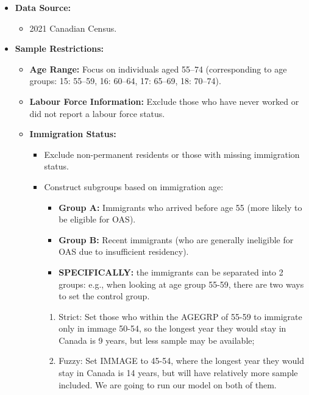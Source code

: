 \documentclass[
]{article}
\providecommand{\tightlist}{%
  \setlength{\itemsep}{0pt}\setlength{\parskip}{0pt}}
\begin{document}
\begin{itemize}
\tightlist
\item
  \textbf{Data Source:}

  \begin{itemize}
  \tightlist
  \item
    2021 Canadian Census.
  \end{itemize}
\item
  \textbf{Sample Restrictions:}

  \begin{itemize}
  \tightlist
  \item
    \textbf{Age Range:} Focus on individuals aged 55--74 (corresponding
    to age groups: 15: 55--59, 16: 60--64, 17: 65--69, 18: 70--74).
  \item
    \textbf{Labour Force Information:} Exclude those who have never
    worked or did not report a labour force status.
  \item
    \textbf{Immigration Status:}

    \begin{itemize}
    \tightlist
    \item
      Exclude non-permanent residents or those with missing immigration
      status.
    \item
      Construct subgroups based on immigration age:

      \begin{itemize}
      \tightlist
      \item
        \textbf{Group A:} Immigrants who arrived before age 55 (more
        likely to be eligible for OAS).
      \item
        \textbf{Group B:} Recent immigrants (who are generally
        ineligible for OAS due to insufficient residency).
      \item
        \textbf{SPECIFICALLY:} the immigrants can be separated into 2
        groups: e.g., when looking at age group 55-59, there are two
        ways to set the control group.
      \end{itemize}

      \begin{enumerate}
      \def\labelenumi{\arabic{enumi}.}
      \tightlist
      \item
        Strict: Set those who within the AGEGRP of 55-59 to immigrate
        only in immage 50-54, so the longest year they would stay in
        Canada is 9 years, but less sample may be available;
      \item
        Fuzzy: Set IMMAGE to 45-54, where the longest year they would
        stay in Canada is 14 years, but will have relatively more sample
        included. We are going to run our model on both of them.
      \end{enumerate}
    \end{itemize}
  \end{itemize}
\end{itemize}
\end{document}
